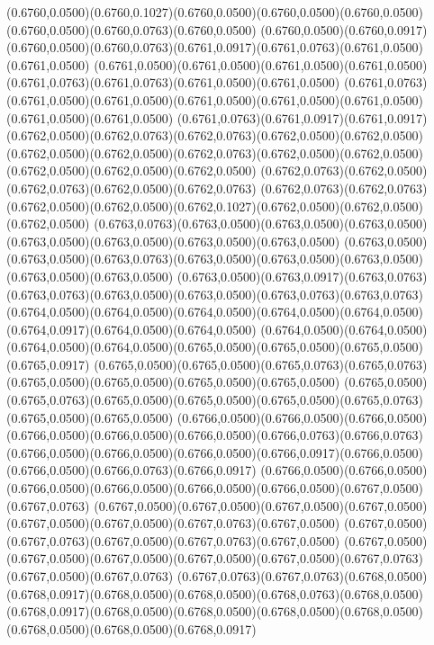 (0.6760,0.0500)(0.6760,0.1027)(0.6760,0.0500)(0.6760,0.0500)(0.6760,0.0500)(0.6760,0.0500)(0.6760,0.0763)(0.6760,0.0500)
(0.6760,0.0500)(0.6760,0.0917)(0.6760,0.0500)(0.6760,0.0763)(0.6761,0.0917)(0.6761,0.0763)(0.6761,0.0500)(0.6761,0.0500)
(0.6761,0.0500)(0.6761,0.0500)(0.6761,0.0500)(0.6761,0.0500)(0.6761,0.0763)(0.6761,0.0763)(0.6761,0.0500)(0.6761,0.0500)
(0.6761,0.0763)(0.6761,0.0500)(0.6761,0.0500)(0.6761,0.0500)(0.6761,0.0500)(0.6761,0.0500)(0.6761,0.0500)(0.6761,0.0500)
(0.6761,0.0763)(0.6761,0.0917)(0.6761,0.0917)(0.6762,0.0500)(0.6762,0.0763)(0.6762,0.0763)(0.6762,0.0500)(0.6762,0.0500)
(0.6762,0.0500)(0.6762,0.0500)(0.6762,0.0763)(0.6762,0.0500)(0.6762,0.0500)(0.6762,0.0500)(0.6762,0.0500)(0.6762,0.0500)
(0.6762,0.0763)(0.6762,0.0500)(0.6762,0.0763)(0.6762,0.0500)(0.6762,0.0763)
\PST@Solid(0.6762,0.0763)(0.6762,0.0763)(0.6762,0.0500)(0.6762,0.0500)(0.6762,0.1027)(0.6762,0.0500)(0.6762,0.0500)(0.6762,0.0500)
(0.6763,0.0763)(0.6763,0.0500)(0.6763,0.0500)(0.6763,0.0500)(0.6763,0.0500)(0.6763,0.0500)(0.6763,0.0500)(0.6763,0.0500)
(0.6763,0.0500)(0.6763,0.0500)(0.6763,0.0763)(0.6763,0.0500)(0.6763,0.0500)(0.6763,0.0500)(0.6763,0.0500)(0.6763,0.0500)
(0.6763,0.0500)(0.6763,0.0917)(0.6763,0.0763)(0.6763,0.0763)(0.6763,0.0500)(0.6763,0.0500)(0.6763,0.0763)(0.6763,0.0763)
(0.6764,0.0500)(0.6764,0.0500)(0.6764,0.0500)(0.6764,0.0500)(0.6764,0.0500)(0.6764,0.0917)(0.6764,0.0500)(0.6764,0.0500)
(0.6764,0.0500)(0.6764,0.0500)(0.6764,0.0500)(0.6764,0.0500)(0.6765,0.0500)(0.6765,0.0500)(0.6765,0.0500)(0.6765,0.0917)
(0.6765,0.0500)(0.6765,0.0500)(0.6765,0.0763)(0.6765,0.0763)(0.6765,0.0500)(0.6765,0.0500)(0.6765,0.0500)(0.6765,0.0500)
(0.6765,0.0500)(0.6765,0.0763)(0.6765,0.0500)(0.6765,0.0500)(0.6765,0.0500)(0.6765,0.0763)(0.6765,0.0500)(0.6765,0.0500)
(0.6766,0.0500)(0.6766,0.0500)(0.6766,0.0500)(0.6766,0.0500)(0.6766,0.0500)(0.6766,0.0500)(0.6766,0.0763)(0.6766,0.0763)
(0.6766,0.0500)(0.6766,0.0500)(0.6766,0.0500)(0.6766,0.0917)(0.6766,0.0500)(0.6766,0.0500)(0.6766,0.0763)(0.6766,0.0917)
(0.6766,0.0500)(0.6766,0.0500)(0.6766,0.0500)(0.6766,0.0500)(0.6766,0.0500)(0.6766,0.0500)(0.6767,0.0500)(0.6767,0.0763)
(0.6767,0.0500)(0.6767,0.0500)(0.6767,0.0500)(0.6767,0.0500)(0.6767,0.0500)(0.6767,0.0500)(0.6767,0.0763)(0.6767,0.0500)
(0.6767,0.0500)(0.6767,0.0763)(0.6767,0.0500)(0.6767,0.0763)(0.6767,0.0500)
\PST@Solid(0.6767,0.0500)(0.6767,0.0500)(0.6767,0.0500)(0.6767,0.0500)(0.6767,0.0500)(0.6767,0.0763)(0.6767,0.0500)(0.6767,0.0763)
(0.6767,0.0763)(0.6767,0.0763)(0.6768,0.0500)(0.6768,0.0917)(0.6768,0.0500)(0.6768,0.0500)(0.6768,0.0763)(0.6768,0.0500)
(0.6768,0.0917)(0.6768,0.0500)(0.6768,0.0500)(0.6768,0.0500)(0.6768,0.0500)(0.6768,0.0500)(0.6768,0.0500)(0.6768,0.0917)

